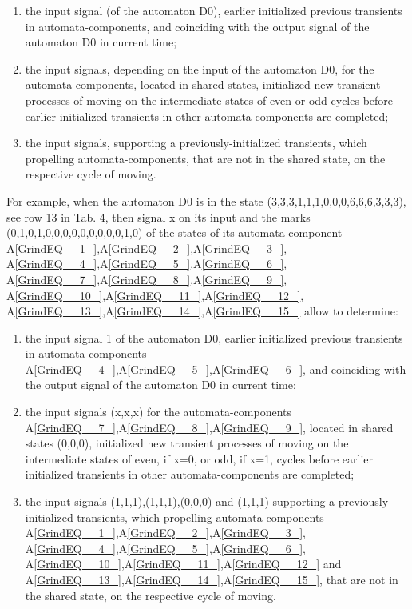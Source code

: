 \documentclass{article}
\begin{document}
\begin{enumerate}
\item  the input signal (of the automaton D0), earlier initialized previous transients in automata-components, and coinciding with the output signal of the automaton D0 in current time;

\item  the input signals, depending on the input of the automaton D0, for the automata-components, located in shared states, initialized new transient processes of moving on the intermediate states of even or odd cycles before earlier initialized transients in other automata-components are completed;

\item  the input signals, supporting a previously-initialized transients, which propelling automata-components, that are not in the shared state, on the respective cycle of moving.
\end{enumerate}

For example, when the automaton D0 is in the state (3,3,3,1,1,1,0,0,0,6,6,6,3,3,3), see row 13 in Tab. 4, then signal x on its input and the marks (0,1,0,1,0,0,0,0,0,0,0,0,0,1,0) of the states of its automata-component A\eqref{GrindEQ__1_},A\eqref{GrindEQ__2_},A\eqref{GrindEQ__3_}, A\eqref{GrindEQ__4_},A\eqref{GrindEQ__5_},A\eqref{GrindEQ__6_}, A\eqref{GrindEQ__7_},A\eqref{GrindEQ__8_},A\eqref{GrindEQ__9_}, A\eqref{GrindEQ__10_},A\eqref{GrindEQ__11_},A\eqref{GrindEQ__12_}, A\eqref{GrindEQ__13_},A\eqref{GrindEQ__14_},A\eqref{GrindEQ__15_} allow to determine:

\begin{enumerate}
\item  the input signal 1 of the automaton D0, earlier initialized previous transients in automata-components A\eqref{GrindEQ__4_},A\eqref{GrindEQ__5_},A\eqref{GrindEQ__6_}, and coinciding with the output signal of the automaton D0 in current time;

\item  the input signals (x,x,x) for the automata-components A\eqref{GrindEQ__7_},A\eqref{GrindEQ__8_},A\eqref{GrindEQ__9_}, located in shared states (0,0,0), initialized new transient processes of moving on the intermediate states of even, if x=0, or odd, if x=1, cycles before earlier initialized transients in other automata-components are completed;

\item  the input signals (1,1,1),(1,1,1),(0,0,0) and (1,1,1) supporting a previously-initialized transients, which propelling automata-components A\eqref{GrindEQ__1_},A\eqref{GrindEQ__2_},A\eqref{GrindEQ__3_}, A\eqref{GrindEQ__4_},A\eqref{GrindEQ__5_},A\eqref{GrindEQ__6_}, A\eqref{GrindEQ__10_},A\eqref{GrindEQ__11_},A\eqref{GrindEQ__12_} and A\eqref{GrindEQ__13_},A\eqref{GrindEQ__14_},A\eqref{GrindEQ__15_}, that are not in the shared state, on the respective cycle of moving.
\end{enumerate}
\end{document}
